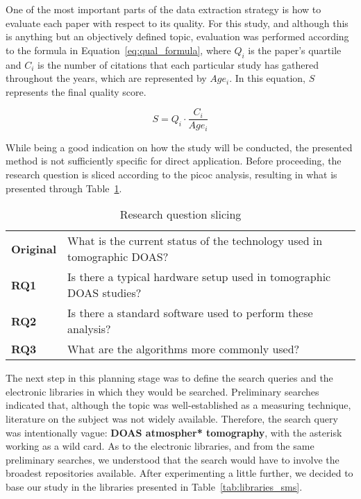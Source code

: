 One of the most important parts of the data extraction strategy is how
to evaluate each paper with respect to its quality. For this study, and
although this is anything but an objectively defined topic, evaluation
was performed according to the formula in
Equation~\ref{eq:qual_formula}, where $Q_i$ is the paper's quartile and
$C_i$ is the number of citations that each particular study has gathered
throughout the years, which are represented by $Age_i$. In this
equation, $S$ represents the final quality score.

\begin{equation}
    \label{eq:qual_formula}
    S = Q_{i} \cdot \frac{C_i}{Age_i}
\end{equation}

While being a good indication on how the study will be conducted, the
presented method is not sufficiently specific for direct application.
Before proceeding, the research question is sliced according to the
\gls{picoc} analysis, resulting in what is presented through
Table~\ref{tab:rq_slicing_sms}.

\begin{table}[htb]
\centering
\small
\caption{Research question slicing}
\label{tab:rq_slicing_sms}
    \begin{tabularx}{\textwidth}{lX}
        \toprule
        \textbf{Original} & What is the current status of the technology used in
        tomographic DOAS? \\
        \textbf{RQ1} & Is there a typical hardware setup used in tomographic
        DOAS studies? \\
        \textbf{RQ2} & Is there a standard software used to perform these
        analysis? \\
        \textbf{RQ3} & What are the algorithms more commonly used?\\\bottomrule
    \end{tabularx}
\end{table}

The next step in this planning stage was to define the search queries
and the electronic libraries in which they would be searched.
Preliminary searches indicated that, although the topic was
well-established as a measuring technique, literature on the subject was
not widely available. Therefore, the search query was intentionally
vague: \textbf{DOAS atmospher* tomography}, with the asterisk working as
a wild card. As to the electronic libraries, and from the same
preliminary searches, we understood that the search would have to
involve the broadest repositories available. After experimenting a
little further, we decided to base our study in the libraries presented
in Table~\ref{tab:libraries_sms}.

